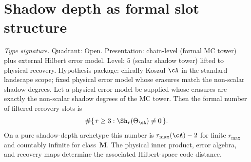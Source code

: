 %
%

\section{Shadow depth as formal slot structure}
\label{sec:hc-redundancy}

\begin{conjecture}
\ClaimStatusConjectured
\label{conj:thqg-shadow-depth-code-distance}
\textit{Type signature.} Quadrant: Open. Presentation: chain-level
(formal MC tower) plus external Hilbert error model. Level: $5$
(scalar shadow tower) lifted to physical recovery. Hypothesis
package: chirally Koszul $\cA$ in the standard-landscape scope;
fixed physical error model whose erasures match the non-scalar
shadow degrees.
\smallskip\noindent
Let a physical error model be supplied whose erasures are exactly the
non-scalar shadow degrees of the MC tower.  Then the formal number of
filtered recovery slots is
\[
\#\{\,r\ge 3:\Sh_r(\Theta_\cA)\neq 0\,\}.
\]
On a pure shadow-depth archetype this number is $r_{\max}(\cA)-2$
for finite $r_{\max}$ and countably infinite for class~$\mathbf M$.
The physical inner product, error algebra, and recovery maps determine
the associated Hilbert-space code distance.
\end{conjecture}

